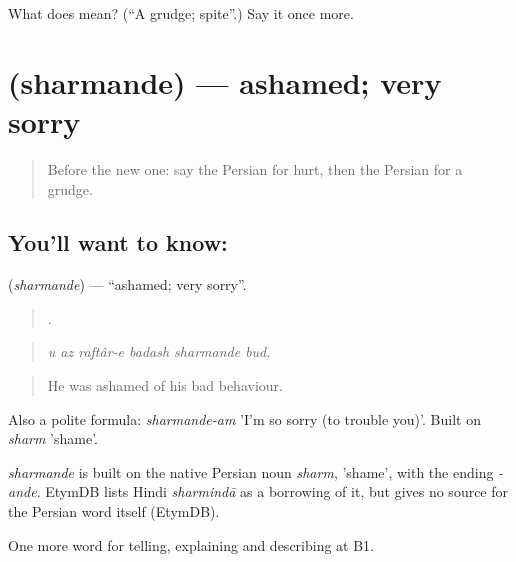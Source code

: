 \begin{tcolorbox}[breakable,colback=teal!4,colframe=teal!35!black,title={Before you move on}]
What does  mean? (\textquotedblleft{}A grudge; spite\textquotedblright{}.) Say it once more.
\end{tcolorbox}
\section[\texorpdfstring{\fa{شرمنده} (sharmande)}{شرمنده (sharmande)}]{ (sharmande) — ashamed; very sorry}

\label{lesson:FA-C482-sharmande}



\begin{quote}
Before the new one: say the Persian for hurt, then the Persian for a grudge.
\end{quote}

\subsection*{You'll want to know: }
\textbf{} (\emph{sharmande}) — \textquotedblleft{}ashamed; very sorry\textquotedblright{}.

\begin{quote}
     .
\end{quote}

\begin{quote}
\emph{u az raftâr-e badash sharmande bud.}
\end{quote}

\begin{quote}
He was ashamed of his bad behaviour.
\end{quote}

Also a polite formula: \emph{sharmande-am} 'I'm so sorry (to trouble you)'. Built on \emph{sharm} 'shame'.

\begin{cousinweb}
\emph{sharmande} is built on the native Persian noun \emph{sharm}, 'shame', with the ending \emph{-ande}. EtymDB lists Hindi \emph{sharmindā} as a borrowing of it, but gives no source for the Persian word itself (EtymDB).
\end{cousinweb}

\begin{grammarlens}[title={What you've built}]
One more word for telling, explaining and describing at B1.
\end{grammarlens}

